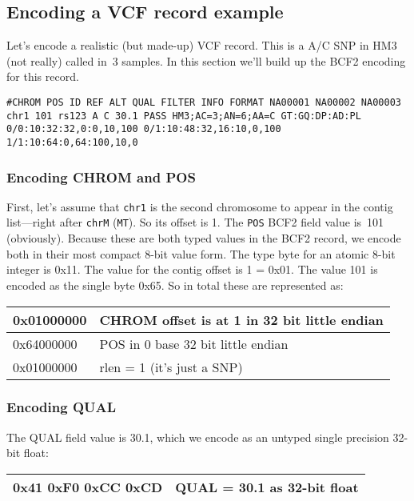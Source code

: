 \documentclass[8pt]{article}
\begin{document}
\subsection{Encoding a VCF record example}

Let's encode a realistic (but made-up) VCF record.
This is a A/C SNP in HM3 (not really) called in~3 samples.
In this section we'll build up the BCF2 encoding for this record.
\scriptsize
\begin{verbatim}
#CHROM POS ID REF ALT QUAL FILTER INFO FORMAT NA00001 NA00002 NA00003
chr1 101 rs123 A C 30.1 PASS HM3;AC=3;AN=6;AA=C GT:GQ:DP:AD:PL 0/0:10:32:32,0:0,10,100 0/1:10:48:32,16:10,0,100 1/1:10:64:0,64:100,10,0
\end{verbatim}
\normalsize

\subsubsection{Encoding CHROM and POS}

First, let's assume that {\tt chr1} is the second chromosome to appear in the contig list---right after {\tt chrM} ({\tt MT}).
So its offset is 1.
The {\tt POS} BCF2 field value is~101 (obviously).
Because these are both typed values in the BCF2 record, we encode both in their most compact 8-bit value form.
The type byte for an atomic 8-bit integer is 0x11.
The value for the contig offset is 1 = 0x01.
The value 101 is encoded as the single byte 0x65.
So in total these are represented as:

\vspace{0.3cm}
\begin{tabular}{|l | l|} \hline
0x01000000 & CHROM offset is at 1 in 32 bit little endian \\ \hline
0x64000000 & POS in 0 base 32 bit little endian \\ \hline
0x01000000 & rlen = 1 (it's just a SNP) \\ \hline
\end{tabular}

\subsubsection{Encoding QUAL}

The QUAL field value is 30.1, which we encode as an untyped single precision 32-bit float:

\vspace{0.3cm}
\begin{tabular}{|l| l|} \hline
0x41 0xF0 0xCC 0xCD & QUAL = 30.1 as 32-bit float \\ \hline
\end{tabular}
\end{document}
